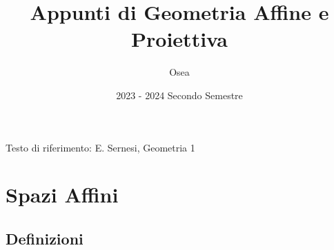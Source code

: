 \documentclass{article}
\title{Appunti di Geometria Affine e Proiettiva}
\author{Osea}
\date{2023 \-- 2024 Secondo Semestre}
\newcommand{\incfig}[2][1]{%
    \def\svgwidth{#1\columnwidth}
    {#2.pdf_tex}
}
\newcounter{theo}[section]\setcounter{theo}{0}
\newcounter{excounter}[section]\setcounter{excounter}{0}
\theoremstyle{plain}
\theoremstyle{definition}
\newtheorem{example}[excounter]{Esempio}
\theoremstyle{remark}
\begin{document}
\maketitle

Testo di riferimento: E. Sernesi,  Geometria 1
\section{Spazi Affini}

\subsection{Definizioni}
%     
% 
\end{document}
